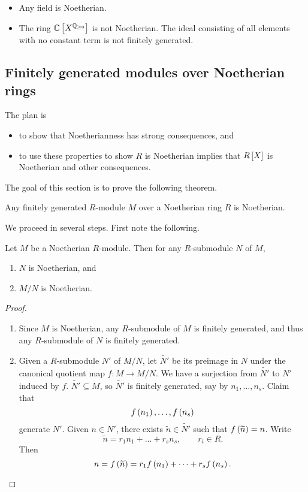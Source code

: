 \begin{example*}
\hfill
\begin{itemize}
\item Any field is Noetherian.
\item The ring $ \C\sbr{X^{\Q_{\ge 0}}} $ is not Noetherian. The ideal consisting of all elements with no constant term is not finitely generated.
\end{itemize}
\end{example*}

\pagebreak

\subsection{Finitely generated modules over Noetherian rings}

The plan is
\begin{itemize}
\item to show that Noetherianness has strong consequences, and
\item to use these properties to show $ R $ is Noetherian implies that $ R\sbr{X} $ is Noetherian and other consequences.
\end{itemize}
The goal of this section is to prove the following theorem.

\begin{theorem}
\label{thm:8.2.1}
Any finitely generated $ R $-module $ M $ over a Noetherian ring $ R $ is Noetherian.
\end{theorem}

We proceed in several steps. First note the following.

\begin{proposition}
Let $ M $ be a Noetherian $ R $-module. Then for any $ R $-submodule $ N $ of $ M $,
\begin{enumerate}
\item $ N $ is Noetherian, and
\item $ M / N $ is Noetherian.
\end{enumerate}
\end{proposition}

\begin{proof}
\hfill
\begin{enumerate}
\item Since $ M $ is Noetherian, any $ R $-submodule of $ M $ is finitely generated, and thus any $ R $-submodule of $ N $ is finitely generated.
\item Given a $ R $-submodule $ N' $ of $ M / N $, let $ \widetilde{N'} $ be its preimage in $ N $ under the canonical quotient map $ f : M \to M / N $. We have a surjection from $ \widetilde{N'} $ to $ N' $ induced by $ f $. $ \widetilde{N'} \subseteq M $, so $ \widetilde{N'} $ is finitely generated, say by $ n_1, \dots, n_s $. Claim that
$$ f\br{n_1}, \dots, f\br{n_s} $$
generate $ N' $. Given $ n \in N' $, there exists $ \widetilde{n} \in \widetilde{N'} $ such that $ f\br{\widetilde{n}} = n $. Write
$$ \widetilde{n} = r_1n_1 + \dots + r_sn_s, \qquad r_i \in R. $$
Then
$$ n = f\br{\widetilde{n}} = r_1f\br{n_1} + \dots + r_sf\br{n_s}. $$
\end{enumerate}
\end{proof}

